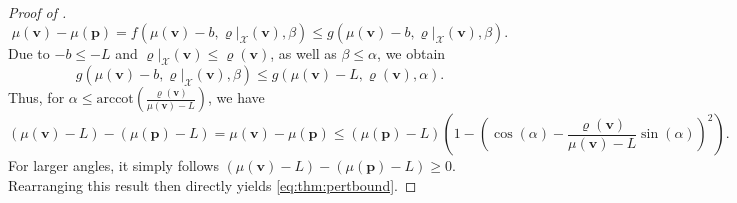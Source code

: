 \documentclass[a4paper,11pt,oneside]{amsart}
\theoremstyle{definition}
\theoremstyle{remark}
\newcommand{\ten}[1]{\boldsymbol{#1}}
\numberwithin{equation}{section}
\numberwithin{theorem}{section}
\begin{document}
\begin{appendix}
\begin{proof}[Proof of ]
\begin{equation}
 \mu(\ten v) - \mu(\ten p) = f(\mu(\ten v)-b,\varrho|_\mathcal{X}(\ten v),\beta) \leq g(\mu(\ten v)-b,\varrho|_\mathcal{X}(\ten v),\beta).
\end{equation}
Due to $-b \leq -L$ and $\varrho|_\mathcal{X}(\ten v) \leq \varrho(\ten v)$, as well as $\beta \leq \alpha$, we obtain
\begin{equation}
 g(\mu(\ten v)-b,\varrho|_\mathcal{X}(\ten v),\beta) \leq g(\mu(\ten v)-L,\varrho(\ten v),\alpha).
\end{equation}
Thus, for $\displaystyle \alpha \leq \mathrm{arccot} \left( \frac{\varrho(\ten v)}{\mu(\ten v) - L} \right)$, we have
\begin{equation*}
 (\mu(\ten v) - L) - (\mu(\ten p) - L) = \mu(\ten v) - \mu(\ten p)
 \leq (\mu(\ten p) - L) ( 1 - ( \cos(\alpha) - \frac{\varrho(\ten v)}{\mu(\ten v ) - L} \sin(\alpha) )^2 ).
\end{equation*}
For larger angles, it simply follows $(\mu(\ten v) - L) - (\mu(\ten p) - L) \geq 0$. Rearranging this result then directly yields \cref{eq:thm:pertbound}.
\end{proof}





\end{appendix}
\end{document}
